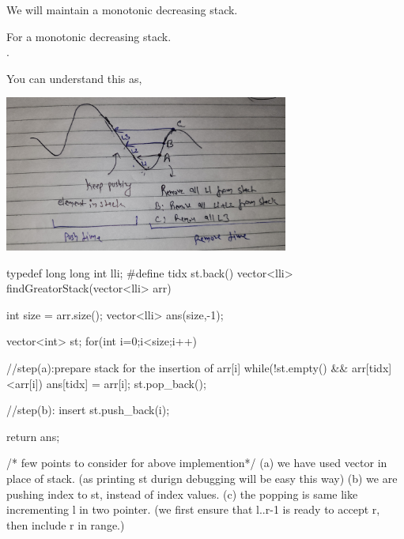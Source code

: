 \begin{solution}[Stack | $O(n)$]
    We will maintain a monotonic decreasing stack.
   
    For a monotonic decreasing stack.\\
    \faHandPointRight\hspace{2mm}{we push array element to stack if current element is smaller than stack tidx}.\\
    \faHandPointRight\hspace{2mm}{we pop a element from stack if current element is greator than stack tidx.}
   
    You can understand this as, 

    \includegraphics[width=0.7\textwidth]{./resources/monotonic-decreasing-stack.jpg}

    \begin{fullwidth}
    \begin{code3}
        typedef long long int lli;
        #define tidx st.back()
        vector<lli> findGreatorStack(vector<lli> arr)
        {
            int size = arr.size();
            vector<lli> ans(size,-1);
            
            vector<int> st;  
            for(int i=0;i<size;i++)
            {
                //step(a):prepare stack for the insertion of arr[i]
                while(!st.empty() && arr[tidx]<arr[i])
                {
                    ans[tidx] = arr[i];
                    st.pop_back();
                }
                
                //step(b): insert
                st.push_back(i);
            }
            
            return ans;
        }

    /* few points to consider for above implemention*/
    (a) we have used vector in place of stack. (as printing st durign debugging will be easy this way)
    (b) we are pushing index to st, instead of index values.
    (c) the popping is same like incrementing l in two pointer. (we first ensure that l..r-1 is ready to accept r, then include r in range.)


\end{code3}
\end{fullwidth}
\end{solution}
